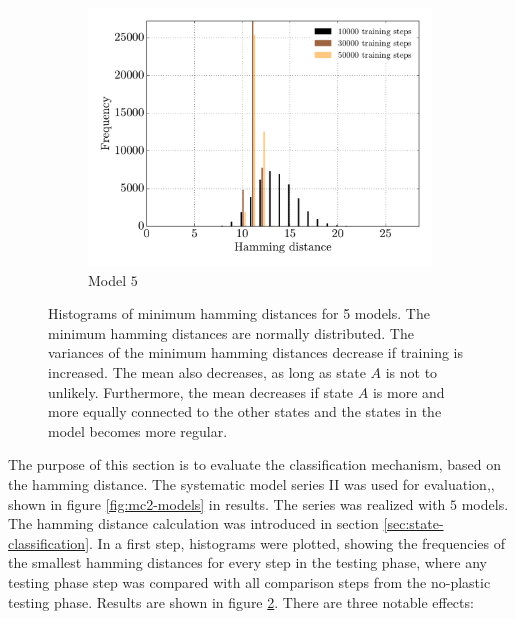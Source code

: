 \begin{figure}[p]
\begin{subfigure}{0.48\textwidth}
        \includegraphics[width=\textwidth]{appendix/hamming_freqs_model5}
        \caption{Model $5$}
        \label{fig:ham-freq-5}
    \end{subfigure}
    \caption[Histograms of minimum hamming distances for 5 models]{Histograms of minimum hamming distances for 5 models. The minimum hamming distances are normally distributed. The variances of the minimum hamming distances decrease if training is increased. The mean also decreases, as long as state $A$ is not to unlikely. Furthermore, the mean decreases if state $A$ is more and more equally connected to the other states and the states in the model becomes more regular.}
    \label{fig:ham-freqs}
\end{figure}

The purpose of this section is to evaluate the classification mechanism, based on the hamming distance. The systematic model series II was used for evaluation,, shown in figure \ref{fig:mc2-models} in results. The series was realized with $5$ models. The hamming distance calculation was introduced in section \ref{sec:state-classification}. In a first step, histograms were plotted, showing the frequencies of the smallest hamming distances for every step in the testing phase, where any testing phase step was compared with all comparison steps from the no-plastic testing phase. Results are shown in figure \ref{fig:ham-freqs}. There are three notable effects:

